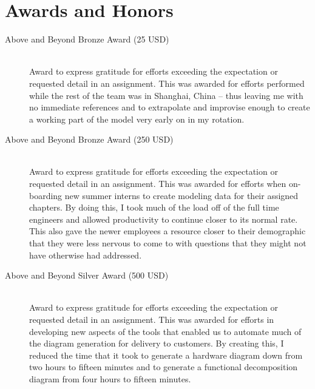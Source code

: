 \documentclass{article}
\begin{document}
\section{Awards and Honors}
\begin{description}
  \item[Above and Beyond Bronze Award (25 USD)] \hfill \\
    Award to express gratitude for efforts exceeding the expectation or requested detail in an assignment. This was awarded for efforts performed while the rest of the team was in Shanghai, China -- thus leaving me with no immediate references and to extrapolate and improvise enough to create a working part of the model very early on in my rotation.
  \item[Above and Beyond Bronze Award (250 USD)] \hfill \\
    Award to express gratitude for efforts exceeding the expectation or requested detail in an assignment. This was awarded for efforts when on-boarding new summer interns to create modeling data for their assigned chapters. By doing this, I took much of the load off of the full time engineers and allowed productivity to continue closer to its normal rate. This also gave the newer employees a resource closer to their demographic that they were less nervous to come to with questions that they might not have otherwise had addressed.
  \item[Above and Beyond Silver Award (500 USD)] \hfill \\
    Award to express gratitude for efforts exceeding the expectation or requested detail in an assignment. This was awarded for efforts in developing new aspects of the tools that enabled us to automate much of the diagram generation for delivery to customers. By creating this, I reduced the time that it took to generate a hardware diagram down from two hours to fifteen minutes and to generate a functional decomposition diagram from four hours to fifteen minutes.
\end{description}
\end{document}
